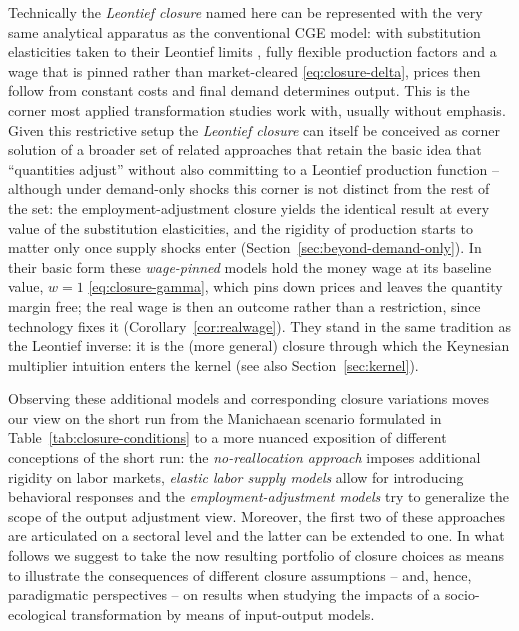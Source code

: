 Technically the \emph{Leontief closure} named here can be represented with the very same analytical apparatus as the conventional CGE model: with substitution elasticities taken to their Leontief limits \citep[see][]{Leontief.1936}, fully flexible production factors and a wage that is pinned rather than market-cleared \eqref{eq:closure-delta}, prices then follow from constant costs and final demand determines output. This is the corner most applied transformation studies work with, usually without emphasis. Given this restrictive setup the \emph{Leontief closure} can itself be conceived as corner solution of a broader set of related approaches that retain the basic idea that ``quantities adjust'' without also committing to a Leontief production function -- although under demand-only shocks this corner is not distinct from the rest of the set: the employment-adjustment closure yields the identical result at every value of the substitution elasticities, and the rigidity of production starts to matter only once supply shocks enter (Section~\ref{sec:beyond-demand-only}). In their basic form these \textit{wage-pinned} models hold the money wage at its baseline value, $w=1$ \eqref{eq:closure-gamma}, which pins down prices and leaves the quantity margin free; the real wage is then an outcome rather than a restriction, since technology fixes it (Corollary~\ref{cor:realwage}). They stand in the same tradition as the Leontief inverse: it is the (more general) closure through which the Keynesian multiplier intuition enters the kernel (see also Section~\ref{sec:kernel}).

Observing these additional models and corresponding closure variations moves our view on the short run from the Manichaean scenario formulated in Table~\ref{tab:closure-conditions} to a more nuanced exposition of different conceptions of the short run: the \textit{no-reallocation approach} imposes additional rigidity on labor markets, \textit{elastic labor supply models} allow for introducing behavioral responses and the \textit{employment-adjustment models} try to generalize the scope of the output adjustment view. Moreover, the first two of these approaches are articulated on a sectoral level and the latter can be extended to one. In what follows we suggest to take the now resulting portfolio of closure choices as means to illustrate the consequences of different closure assumptions -- and, hence, paradigmatic perspectives -- on results when studying the impacts of a socio-ecological transformation by means of input-output models.

